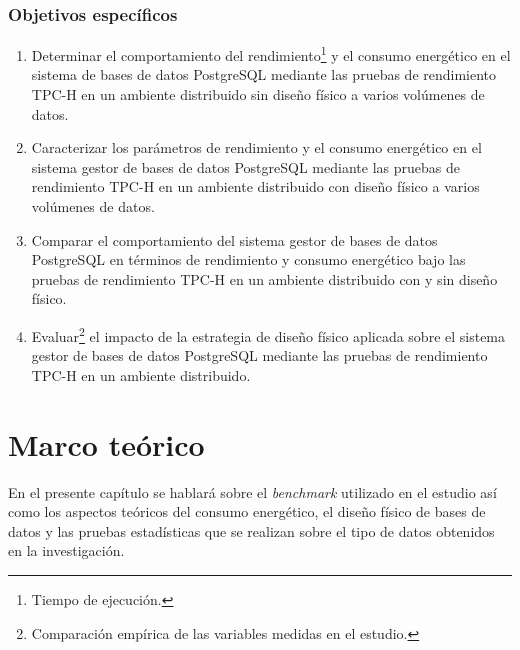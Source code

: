\documentclass[12pt, letter paper]{report}
\begin{document}
      \subsection{Objetivos específicos} %
      \label{sub:objetivos_específicos}
        \begin{enumerate}
          \item Determinar el comportamiento del rendimiento\footnote{Tiempo de
          ejecución.} y el consumo energético en el sistema de bases de datos
          PostgreSQL mediante las pruebas de rendimiento TPC-H en un ambiente 
          distribuido sin diseño físico a varios volúmenes de datos.
          \item Caracterizar los parámetros de rendimiento y el consumo
          energético en el sistema gestor de bases de datos PostgreSQL mediante
          las pruebas de rendimiento TPC-H en un ambiente distribuido con diseño
          físico a varios volúmenes de datos.
          \item Comparar el comportamiento del sistema gestor de bases de datos
          PostgreSQL en términos de rendimiento y consumo energético bajo las
          pruebas de rendimiento TPC-H en un ambiente distribuido con y sin
          diseño físico.
          \item Evaluar\footnote{Comparación empírica de las variables medidas
          en el estudio.} el impacto de la estrategia de diseño físico aplicada
          sobre el sistema gestor de bases de datos PostgreSQL mediante
          las pruebas de rendimiento TPC-H en un ambiente distribuido.
        \end{enumerate}

  \chapter{Marco teórico} %
  \label{cha:marco_teórico}
    En el presente capítulo se hablará sobre el \textit{benchmark} utilizado en
    el estudio así como los aspectos teóricos del consumo energético, el diseño
    físico de bases de datos y las pruebas estadísticas que se realizan sobre el
    tipo de datos obtenidos en la investigación.
\end{document}
